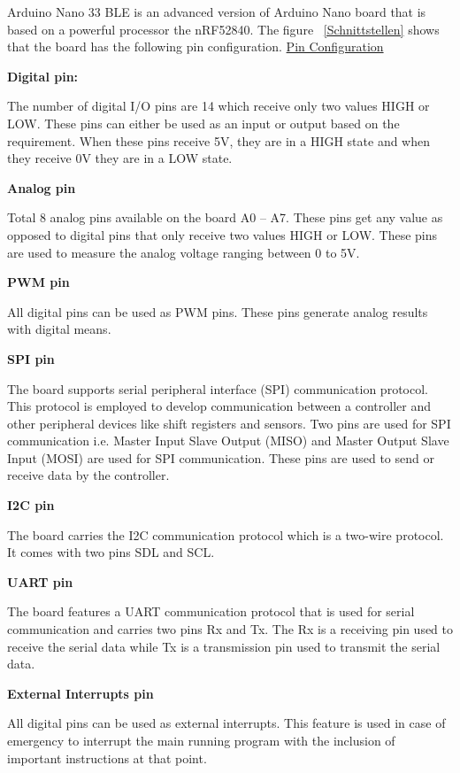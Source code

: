 Arduino Nano 33 BLE is an advanced version of Arduino Nano board that is based on a powerful processor the nRF52840. The figure ~\ref{Schnittstellen} shows that the board has the following pin configuration. \href{https://www.etechnophiles.com/arduino-nano-33-ble-sense-pinout-introduction-specifications/}{Pin Configuration}

\textbf{Digital pin:}

The number of digital I/O pins are 14 which receive only two values HIGH or LOW. These pins can either be used as an input or output based on the requirement. When these pins receive 5V, they are in a HIGH state and when they receive 0V they are in a LOW state.

\textbf{Analog pin}

Total 8 analog pins available on the board A0 – A7. These pins get any value as opposed to digital pins that only receive two values HIGH or LOW. These pins are used to measure the analog voltage ranging between 0 to 5V.


\textbf{PWM pin}

All digital pins can be used as PWM pins. These pins generate analog results with digital means.


\textbf{SPI pin}

The board supports serial peripheral interface (SPI) communication protocol. This protocol is employed to develop communication between a controller and other peripheral devices like shift registers and sensors. Two pins are used for SPI communication i.e. Master Input Slave Output (MISO) and Master Output Slave Input (MOSI) are used for SPI communication. These pins are used to send or receive data by the controller.

\textbf{I2C pin}

The board carries the I2C communication protocol which is a two-wire protocol. It comes with two pins SDL and SCL.

\textbf{UART pin}

The board features a UART communication protocol that is used for serial communication and carries two pins Rx and Tx. The Rx is a receiving pin used to receive the serial data while Tx is a transmission pin used to transmit the serial data.


\textbf{External Interrupts pin}

All digital pins can be used as external interrupts. This feature is used in case of emergency to interrupt the main running program with the inclusion of important instructions at that point.

